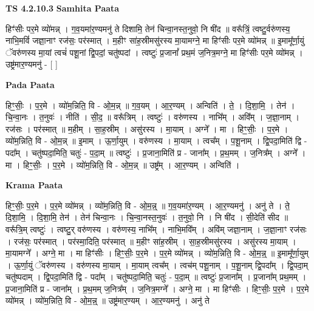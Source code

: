 \documentclass[17pt]{extarticle}
\begin{document}
\textbf{TS 4.2.10.3 } \newline
\textbf{Samhita Paata} \newline

हिꣳ॑सीः पर॒मे व्यो॑मन्न् । ग॒व॒यमा॑र॒ण्यमनु॑ ते दिशामि॒ तेन॑ चिन्वा॒नस्त॒नुवो॒ नि षी॑द ॥ वरू᳚त्रिं॒ त्वष्टु॒र्वरु॑णस्य॒ नाभि॒मविं॑ जज्ञा॒नाꣳ रज॑सः॒ पर॑स्मात् । म॒हीꣳ सा॑ह॒स्रीमसु॑रस्य मा॒यामग्ने॒ मा हिꣳ॑सीः पर॒मे व्यो॑मन्न् ॥ इ॒मामू᳚र्णा॒युं ॅवरु॑णस्य मा॒यां त्वचं॑ पशू॒नां द्वि॒पदां॒ चतु॑ष्पदां । त्वष्टुः॑ प्र॒जानां᳚ प्रथ॒मं ज॒नित्र॒मग्ने॒ मा हिꣳ॑सीः पर॒मे व्यो॑मन्न् । उष्ट्र॑मार॒ण्यमनु॑ - [  ] \newline

\textbf{Pada Paata} \newline

हिꣳ॒॒सीः॒ । प॒र॒मे । व्यो॑म॒न्निति॒ वि - ओ॒म॒न्न् ॥ ग॒व॒यम् । आ॒र॒ण्यम् । अन्विति॑ । ते॒ । दि॒शा॒मि॒ । तेन॑ । चि॒न्वा॒नः । त॒नुवः॑ । नीति॑ । सी॒द॒ ॥ वरू᳚त्रिम् । त्वष्टुः॑ । वरु॑णस्य । नाभि᳚म् । अवि᳚म् । ज॒ज्ञा॒नाम् । रज॑सः । पर॑स्मात् ॥ म॒हीम् । सा॒ह॒स्रीम् । असु॑रस्य । मा॒याम् । अग्ने᳚ । मा । हिꣳ॒॒सीः॒ । प॒र॒मे । व्यो॑म॒न्निति॒ वि - ओ॒म॒न्न् ॥ इ॒माम् । ऊ॒र्णा॒युम् । वरु॑णस्य । मा॒याम् । त्वच᳚म् । प॒शू॒नाम् । द्वि॒पदा॒मिति॑ द्वि - पदा᳚म् । चतु॑ष्पदा॒मिति॒ चतुः॑ - प॒दा॒म् ॥ त्वष्टुः॑ । प्र॒जाना॒मिति॑ प्र - जाना᳚म् । प्र॒थ॒मम् । ज॒नित्र᳚म् । अग्ने᳚ । मा । हिꣳ॒॒सीः॒ । प॒र॒मे । व्यो॑म॒न्निति॒ वि - ओ॒म॒न्न् ॥ उष्ट्र᳚म् । आ॒र॒ण्यम् । अन्विति॑ ।  \newline


\textbf{Krama Paata} \newline

हिꣳ॒॒सीः॒ प॒र॒मे । प॒र॒मे व्यो॑मन्न् । व्यो॑म॒न्निति॒ वि - ओ॒म॒न्न्॒ ॥ ग॒व॒यमा॑र॒ण्यम् । आ॒र॒ण्यमनु॑ । अनु॑ ते । ते॒ दि॒शा॒मि॒ । दि॒शा॒मि॒ तेन॑ । तेन॑ चिन्वा॒नः । चि॒न्वा॒नस्त॒नुवः॑ । त॒नुवो॒ नि । नि षी॑द । सी॒देति॑ सीद ॥ वरू᳚त्रि॒म् त्वष्टुः॑ । त्वष्टु॒र् वरु॑णस्य । वरु॑णस्य॒ नाभि᳚म् । नाभि॒मवि᳚म् । अवि॑म् जज्ञा॒नाम् । ज॒ज्ञा॒नाꣳ रज॑सः । रज॑सः॒ पर॑स्मात् । पर॑स्मा॒दिति॒ पर॑स्मात् ॥ म॒हीꣳ सा॑ह॒स्रीम् । सा॒ह॒स्रीमसु॑रस्य । असु॑रस्य मा॒याम् । मा॒यामग्ने᳚ । अग्ने॒ मा । मा हिꣳ॑सीः । हिꣳ॒॒सीः॒ प॒र॒मे । प॒र॒मे व्यो॑मन्न् । व्यो॑म॒न्निति॒ वि - ओ॒म॒न्न्॒ ॥ इ॒मामू᳚र्णा॒युम् । ऊ॒र्णा॒युं ॅवरु॑णस्य । वरु॑णस्य मा॒याम् । मा॒याम् त्वच᳚म् । त्वच॑म् पशू॒नाम् । प॒शू॒नाम् द्वि॒पदा᳚म् । द्वि॒पदा॒म् चतु॑ष्पदाम् । द्वि॒पदा॒मिति॑ द्वि - पदा᳚म् । चतु॑ष्पदा॒मिति॒ चतुः॑ - प॒दा॒म् ॥ त्वष्टुः॑ प्र॒जाना᳚म् । प्र॒जाना᳚म् प्रथ॒मम् । प्र॒जाना॒मिति॑ प्र - जाना᳚म् । प्र॒थ॒मम् ज॒नित्र᳚म् । ज॒नित्र॒मग्ने᳚ । अग्ने॒ मा । मा हिꣳ॑सीः । हिꣳ॒॒सीः॒ प॒र॒मे । प॒र॒मे व्यो॑मन्न् । व्यो॑म॒न्निति॒ वि - ओ॒म॒न्न्॒ ॥ उष्ट्र॑मार॒ण्यम् । आ॒र॒ण्यमनु॑ । अनु॑ ते \newline
\end{document}
